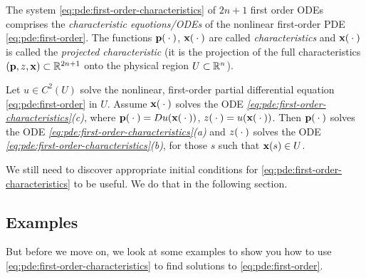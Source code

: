 The system \eqref{eq:pde:first-order-characteristics} of \(2n+1\) first
order ODEs comprises the \emph{characteristic equotions/ODEs} of the
nonlinear first-order PDE \eqref{eq:pde:first-order}. The functions
\(\mathbf{p}({}\cdot{})\), \(\mathbf{x}({}\cdot{})\) are called \emph{characteristics} and
\(\mathbf{x}({}\cdot{})\) is called the \emph{projected characteristic} (it is the
projection of the full characteristics \((\mathbf{p},z,\mathbf{x})\subset\mathbb{R}^{2n+1}\)
onto the physical region \(U\subset\mathbb{R}^n\)).

\begin{theorem}
  Let \(u\in C^2(U)\) solve the nonlinear, first-order partial differential
  equation \eqref{eq:pde:first-order} in \(U\). Assume \(\mathbf{x}({}\cdot{})\)
  solves the ODE \emph{\eqref{eq:pde:first-order-characteristics}(c)},
  where \(\mathbf{p}({}\cdot{})=Du(\mathbf{x}({}\cdot{}))\),
  \(z({}\cdot{})=u(\mathbf{x}({}\cdot{}))\). Then \(\mathbf{p}({}\cdot{})\) solves the ODE
  \emph{\eqref{eq:pde:first-order-characteristics}(a)} and \(z({}\cdot{})\)
  solves the ODE \emph{\eqref{eq:pde:first-order-characteristics}(b)}, for
  those \(s\) such that \(\mathbf{x}(s)\in U\).
\end{theorem}

We still need to discover appropriate initial conditions for
\eqref{eq:pde:first-order-characteristics} to be useful. We do that in the
following section.

\subsection{Examples}
But before we move on, we look at some examples to show you how to use
\eqref{eq:pde:first-order-characteristics} to find solutions to
\eqref{eq:pde:first-order}.

